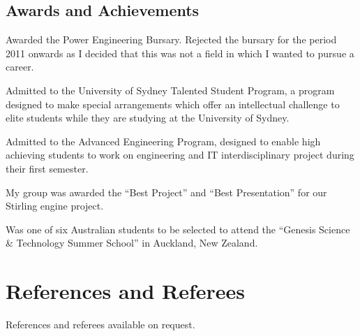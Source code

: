 \documentclass[10pt]{article}
\begin{document}
\subsection*{Awards and Achievements}
\begin{achievements}

{Awarded the  Power Engineering Bursary. 
Rejected the bursary for the period 2011 onwards as I decided that this was not 
a field in which I wanted to pursue a career.}

{Admitted to the University of Sydney Talented Student Program, a program 
designed to make special arrangements which offer an intellectual challenge to 
elite students while they are studying at the University of Sydney.}

{Admitted to the  Advanced Engineering 
Program, designed to enable high achieving students to work on engineering and 
IT interdisciplinary project during their first semester.

My group was awarded the ``Best Project'' and ``Best Presentation'' for our 
Stirling engine project.}

{Was one of six Australian students to be selected to attend the ``Genesis 
Science \& Technology Summer School'' in Auckland, New Zealand.}

\end{achievements}

\section*{References and Referees}
References and referees available on request.
\end{document}
